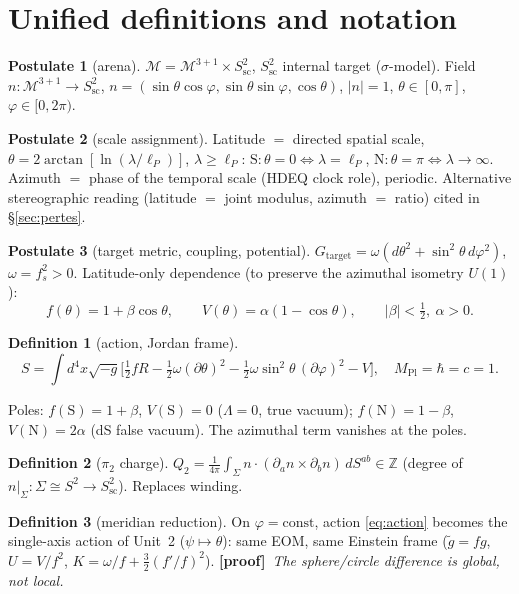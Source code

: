 \documentclass[11pt]{article}
\newcommand{\preuve}{{\small\textbf{[proof]}}}
\newcommand{\Spole}{\mathrm{S}}
\newcommand{\Npole}{\mathrm{N}}
\newcommand{\Mp}{M_{\mathrm{Pl}}}
\newcommand{\lP}{\ell_P}
\newcommand{\Stwo}{S^2_{\text{sc}}}
\theoremstyle{definition}
\newtheorem{post}{Postulate}
\newtheorem{defi}{Definition}
\begin{document}
\section{Unified definitions and notation}
\begin{post}[arena]\label{P1}
$\mathcal{M}=\mathcal{M}^{3+1}\times\Stwo$, $\Stwo$ internal target ($\sigma$-model). Field
$n:\mathcal{M}^{3+1}\to\Stwo$, $n=(\sin\theta\cos\varphi,\sin\theta\sin\varphi,\cos\theta)$, $|n|=1$,
$\theta\in[0,\pi]$, $\varphi\in[0,2\pi)$.
\end{post}
\begin{post}[scale assignment]\label{P2}
Latitude $=$ directed spatial scale, $\theta=2\arctan[\ln(\lambda/\lP)]$, $\lambda\ge\lP$:
$\Spole:\theta{=}0\Leftrightarrow\lambda{=}\lP$, $\Npole:\theta{=}\pi\Leftrightarrow\lambda{\to}\infty$.
Azimuth $=$ phase of the temporal scale (HDEQ clock role), periodic. Alternative stereographic reading
(latitude $=$ joint modulus, azimuth $=$ ratio) cited in \S\ref{sec:pertes}.
\end{post}
\begin{post}[target metric, coupling, potential]\label{P3}
$G_{\text{target}}=\omega(d\theta^2+\sin^2\!\theta\,d\varphi^2)$, $\omega=f_s^2>0$. Latitude-only
dependence (to preserve the azimuthal isometry $U(1)$):
\begin{equation}\label{eq:fV}
f(\theta)=1+\beta\cos\theta,\qquad V(\theta)=\alpha(1-\cos\theta),\qquad |\beta|<\tfrac12,\ \alpha>0.
\end{equation}
\end{post}
\begin{defi}[action, Jordan frame]
\begin{equation}\label{eq:action}
S=\int d^4x\sqrt{-g}\Big[\tfrac12 fR-\tfrac12\omega(\partial\theta)^2
-\tfrac12\omega\sin^2\!\theta\,(\partial\varphi)^2-V\Big],\quad \Mp=\hbar=c=1.
\end{equation}
\end{defi}
\noindent Poles: $f(\Spole)=1+\beta$, $V(\Spole)=0$ ($\Lambda=0$, true vacuum);
$f(\Npole)=1-\beta$, $V(\Npole)=2\alpha$ (dS false vacuum). The azimuthal term vanishes at the poles.
\begin{defi}[$\pi_2$ charge]
$Q_2=\frac{1}{4\pi}\int_\Sigma n\cdot(\partial_a n\times\partial_b n)\,dS^{ab}\in\mathbb{Z}$
(degree of $n|_\Sigma:\Sigma\cong S^2\to\Stwo$). Replaces winding.
\end{defi}
\begin{defi}[meridian reduction]\label{def:merid}
On $\varphi=\mathrm{const}$, action \eqref{eq:action} becomes the single-axis action of Unit~2
($\psi\mapsto\theta$): same EOM, same Einstein frame ($\tilde g=fg$, $U=V/f^2$,
$K=\omega/f+\tfrac32(f'/f)^2$). \preuve\ \emph{The sphere/circle difference is global, not local.}
\end{defi}
\end{document}
